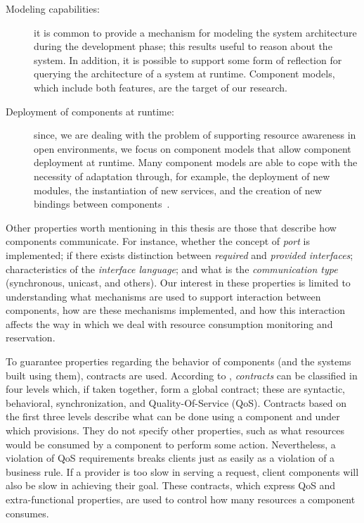 \begin{description}
\item[Modeling capabilities:] it is common to provide a mechanism for modeling the system architecture during the development phase; this results useful to reason about the system.
In addition, it is possible to support some form of reflection for querying the architecture of a system at runtime.
Component models, which include both features, are the target of our research.

\item[Deployment of components at runtime:] since, we are dealing with the problem of supporting resource awareness in open environments, we focus on component models that allow component deployment at runtime.
Many component models are able to cope with the necessity of adaptation through, for example, the deployment of new modules, the instantiation of new services, and the creation of new bindings between components~\cite{Porter:2014:RMC:2602458.2602471, Zheng:2014:RCC:2679601.2680405, Irmert:2008:RAS:1370018.1370036, Ghezzi:2010:QDD:2163764.2163774}.
\end{description}

Other properties worth mentioning in this thesis are those that describe how components communicate.
For instance,  whether the concept of \textit{port} is implemented; if there exists distinction between \textit{required} and \textit{provided interfaces}; characteristics of the \textit{interface language}; and what is the \textit{communication type} (synchronous, unicast, and others).
Our interest in these properties is limited to understanding what mechanisms are used to support interaction between components, how are these mechanisms implemented, and how this interaction affects the way in which we deal with resource consumption monitoring and reservation.

To guarantee properties regarding the behavior of components (and the systems built using them), contracts are used. 
According to \cite{Beugnard774917}, \textit{contracts} can be classified in four levels which, if
taken together, form a global contract; these are syntactic, behavioral, synchronization, and Quality-Of-Service (QoS).
Contracts based on the first three levels describe what can be done using a component and under which provisions.
They do not specify other properties, such as what resources would be consumed by a component to perform some action.
Nevertheless, a violation of QoS requirements breaks clients just as easily as a violation of a business rule.
If a provider is too slow in serving a request, client components will also be slow in achieving their goal.
These contracts, which express QoS and extra-functional properties, are used to control how many resources a component consumes.

